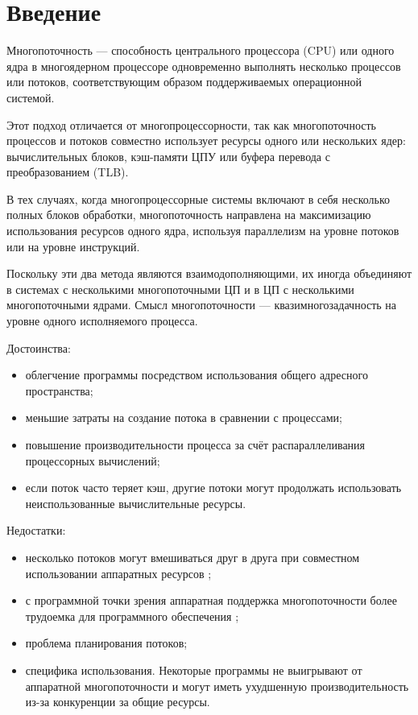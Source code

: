 \documentclass[a4paper,oneside,14pt]{extreport}
\begin{document}

\newpage
\tableofcontents
{}

\newpage

\chapter*{Введение}
Многопоточность — способность центрального процессора (CPU) или одного ядра
в многоядерном процессоре одновременно выполнять несколько процессов или
потоков, соответствующим образом поддерживаемых операционной системой.

Этот подход отличается от многопроцессорности, так как многопоточность
процессов и потоков совместно использует ресурсы одного или нескольких ядер:
вычислительных блоков, кэш-памяти ЦПУ или буфера перевода с преобразованием (TLB).

В тех случаях, когда многопроцессорные системы включают в себя несколько полных блоков обработки,
многопоточность направлена на максимизацию использования ресурсов одного ядра,
используя параллелизм на уровне потоков или на уровне инструкций.

Поскольку эти два метода являются взаимодополняющими,
их иногда объединяют в системах с несколькими многопоточными ЦП
и в ЦП с несколькими многопоточными ядрами.
Смысл многопоточности — квазимногозадачность на уровне одного исполняемого процесса.

Достоинства:
\begin{itemize}
	\item облегчение программы посредством использования общего адресного пространства;
	\item меньшие затраты на создание потока в сравнении с процессами;
	\item повышение производительности процесса за счёт распараллеливания процессорных вычислений;
	\item если поток часто теряет кэш, другие потоки могут продолжать
	использовать неиспользованные вычислительные ресурсы.
\end{itemize}

Недостатки:
\begin{itemize}
	\item несколько потоков могут вмешиваться друг в друга при совместном
	использовании аппаратных ресурсов \cite{Nemirovsky};
	\item с программной точки зрения аппаратная поддержка многопоточности
	более трудоемка для программного обеспечения \cite{Olukotun};
	\item проблема планирования потоков;
	\item специфика использования. Некоторые программы не выигрывают от аппаратной многопоточности
	и могут иметь ухудшенную производительность из-за конкуренции за общие ресурсы.
\end{itemize}
\end{document}
